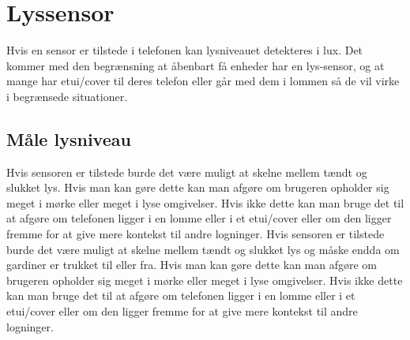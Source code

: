 \section{Lyssensor}
Hvis en sensor er tilstede i telefonen kan lysniveauet detekteres i lux. Det kommer med den begrænsning at åbenbart få enheder har en lys-sensor, og at mange har etui/cover til deres telefon eller går med dem i lommen så de vil virke i begrænsede situationer.

\subsection{Måle lysniveau}
Hvis sensoren er tilstede burde det være muligt at skelne mellem tændt og slukket lys. Hvis man kan gøre dette kan man afgøre om brugeren opholder sig meget i mørke eller meget i lyse omgivelser. Hvis ikke dette kan man bruge det til at afgøre om telefonen ligger i en lomme eller i et etui/cover eller om den ligger fremme for at give mere kontekst til andre logninger.
Hvis sensoren er tilstede burde det være muligt at skelne mellem tændt og slukket lys og måske endda om gardiner er trukket til eller fra. 
Hvis man kan gøre dette kan man afgøre om brugeren opholder sig meget i mørke eller meget i lyse omgivelser. 
Hvis ikke dette kan man bruge det til at afgøre om telefonen ligger i en lomme eller i et etui/cover eller om den ligger fremme for at give mere kontekst til andre logninger.

